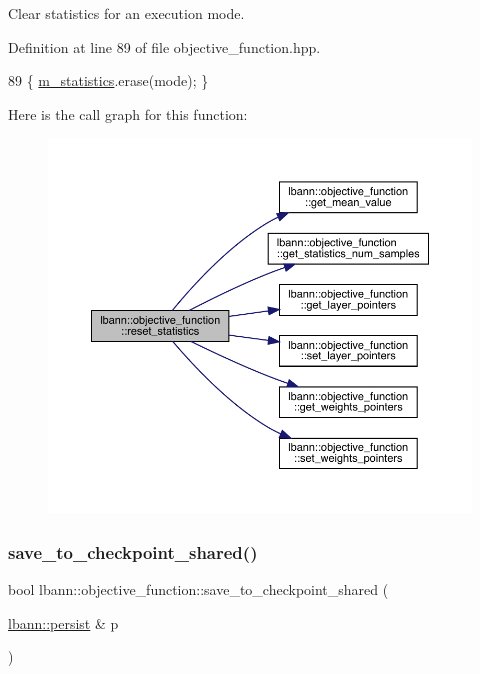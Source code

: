 Clear statistics for an execution mode. 

Definition at line 89 of file objective\+\_\+function.\+hpp.


\begin{DoxyCode}
89 \{ \hyperlink{classlbann_1_1objective__function_ad5daa18c52374a849c6fbd515bcc1eb1}{m\_statistics}.erase(mode); \}
\end{DoxyCode}
Here is the call graph for this function\+:\nopagebreak
\begin{figure}[H]
\begin{center}
\leavevmode
\includegraphics[width=350pt]{classlbann_1_1objective__function_a3c564d26d6c75007ae95153cef3b8c02_cgraph}
\end{center}
\end{figure}
\mbox{\label{classlbann_1_1objective__function_a5c7de99300ce17535648bfcbc3b97aeb}} 
\subsubsection{\texorpdfstring{save\+\_\+to\+\_\+checkpoint\+\_\+shared()}{save\_to\_checkpoint\_shared()}}
{\footnotesize\ttfamily bool lbann\+::objective\+\_\+function\+::save\+\_\+to\+\_\+checkpoint\+\_\+shared (\begin{DoxyParamCaption}\item[{\hyperlink{classlbann_1_1persist}{lbann\+::persist} \&}]{p }\end{DoxyParamCaption})}



